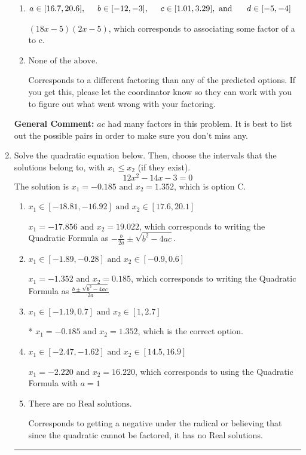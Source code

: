 \documentclass{extbook}[14pt]
\newcommand{\litem}[1]{\item #1

\rule{\textwidth}{0.4pt}}
\begin{document}
\begin{enumerate}
{\begin{enumerate}[label=\Alph*.]
* $(6x -5)(6x -5)$, which is the correct option.
\item \( a \in [16.7, 20.6], \hspace*{5mm} b \in [-12, -3], \hspace*{5mm} c \in [1.01, 3.29], \text{ and } \hspace*{5mm} d \in [-5, -4] \)

 $(18x -5)(2x -5)$, which corresponds to associating some factor of a to c.
\item \( \text{None of the above.} \)

 Corresponds to a different factoring than any of the predicted options. If you get this, please let the coordinator know so they can work with you to figure out what went wrong with your factoring.
\end{enumerate}

\textbf{General Comment:} $ac$ had many factors in this problem. It is best to list out the possible pairs in order to make sure you don't miss any.
}
\litem{
Solve the quadratic equation below. Then, choose the intervals that the solutions belong to, with $x_1 \leq x_2$ (if they exist).
\[ 12x^{2} -14 x -3 = 0 \]The solution is \( x_1 = -0.185 \text{ and } x_2 = 1.352 \), which is option C.\begin{enumerate}[label=\Alph*.]
\item \( x_1 \in [-18.81, -16.92] \text{ and } x_2 \in [17.6, 20.1] \)

 $x_1 = -17.856 \text{ and } x_2 = 19.022$, which corresponds to writing the Quadratic Formula as $-\frac{b}{2a} \pm \sqrt{b^2 - 4ac}$.
\item \( x_1 \in [-1.89, -0.28] \text{ and } x_2 \in [-0.9, 0.6] \)

 $x_1 = -1.352 \text{ and } x_2 = 0.185$, which corresponds to writing the Quadratic Formula as $\frac{b \pm \sqrt{b^2 - 4ac}}{2a}$
\item \( x_1 \in [-1.19, 0.7] \text{ and } x_2 \in [1, 2.7] \)

* $x_1 = -0.185 \text{ and } x_2 = 1.352$, which is the correct option.
\item \( x_1 \in [-2.47, -1.62] \text{ and } x_2 \in [14.5, 16.9] \)

 $x_1 = -2.220 \text{ and } x_2 = 16.220$, which corresponds to using the Quadratic Formula with $a=1$
\item \( \text{There are no Real solutions.} \)

Corresponds to getting a negative under the radical or believing that since the quadratic cannot be factored, it has no Real solutions.
\end{enumerate}

}
\end{enumerate}
\end{document}

